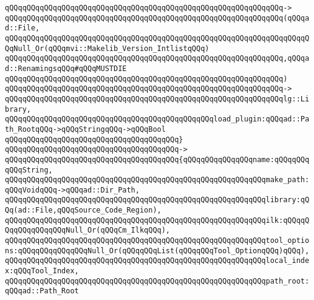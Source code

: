 \verb|qQQqqQQqqQQqqQQqqQQqqQQqqQQqqQQqqQQqqQQqqQQqqQQqqQQqqQQqqQQqqQQq->|\newline
\verb|qQQqqQQqqQQqqQQqqQQqqQQqqQQqqQQqqQQqqQQqqQQqqQQqqQQqqQQqqQQqqQQq(qQQqad::File,|\newline
\verb|qQQqqQQqqQQqqQQqqQQqqQQqqQQqqQQqqQQqqQQqqQQqqQQqqQQqqQQqqQQqqQQqqQQqqQQqNull_Or(qQQqmvi::Makelib_Version_IntlistqQQq)|\newline
\verb|qQQqqQQqqQQqqQQqqQQqqQQqqQQqqQQqqQQqqQQqqQQqqQQqqQQqqQQqqQQqqQQq,qQQqad::RenamingsqQQq#qQQqMUSTDIE|\newline
\verb|qQQqqQQqqQQqqQQqqQQqqQQqqQQqqQQqqQQqqQQqqQQqqQQqqQQqqQQqqQQqqQQq)|\newline
\verb|qQQqqQQqqQQqqQQqqQQqqQQqqQQqqQQqqQQqqQQqqQQqqQQqqQQqqQQqqQQqqQQq->|\newline
\verb|qQQqqQQqqQQqqQQqqQQqqQQqqQQqqQQqqQQqqQQqqQQqqQQqqQQqqQQqqQQqqQQqlg::Library,|\newline
\newline
\verb|qQQqqQQqqQQqqQQqqQQqqQQqqQQqqQQqqQQqqQQqqQQqqQQqload_plugin:qQQqad::Path_RootqQQq->qQQqStringqQQq->qQQqBool|\newline
\verb|qQQqqQQqqQQqqQQqqQQqqQQqqQQqqQQqqQQqqQQq}|\newline
\verb|qQQqqQQqqQQqqQQqqQQqqQQqqQQqqQQqqQQqqQQq->|\newline
\verb|qQQqqQQqqQQqqQQqqQQqqQQqqQQqqQQqqQQqqQQq{qQQqqQQqqQQqqQQqname:qQQqqQQqqQQqString,|\newline
\verb|qQQqqQQqqQQqqQQqqQQqqQQqqQQqqQQqqQQqqQQqqQQqqQQqqQQqqQQqqQQqmake_path:qQQqVoidqQQq->qQQqad::Dir_Path,|\newline
\newline
\verb|qQQqqQQqqQQqqQQqqQQqqQQqqQQqqQQqqQQqqQQqqQQqqQQqqQQqqQQqqQQqlibrary:qQQq(ad::File,qQQqSource_Code_Region),|\newline
\verb|qQQqqQQqqQQqqQQqqQQqqQQqqQQqqQQqqQQqqQQqqQQqqQQqqQQqqQQqqQQqilk:qQQqqQQqqQQqqQQqqQQqNull_Or(qQQqCm_IlkqQQq),|\newline
\newline
\verb|qQQqqQQqqQQqqQQqqQQqqQQqqQQqqQQqqQQqqQQqqQQqqQQqqQQqqQQqqQQqtool_options:qQQqqQQqqQQqqQQqNull_Or(qQQqqQQqList(qQQqqQQqTool_OptionqQQq)qQQq),|\newline
\verb|qQQqqQQqqQQqqQQqqQQqqQQqqQQqqQQqqQQqqQQqqQQqqQQqqQQqqQQqqQQqlocal_index:qQQqTool_Index,|\newline
\newline
\verb|qQQqqQQqqQQqqQQqqQQqqQQqqQQqqQQqqQQqqQQqqQQqqQQqqQQqqQQqqQQqpath_root:qQQqad::Path_Root|\newline
